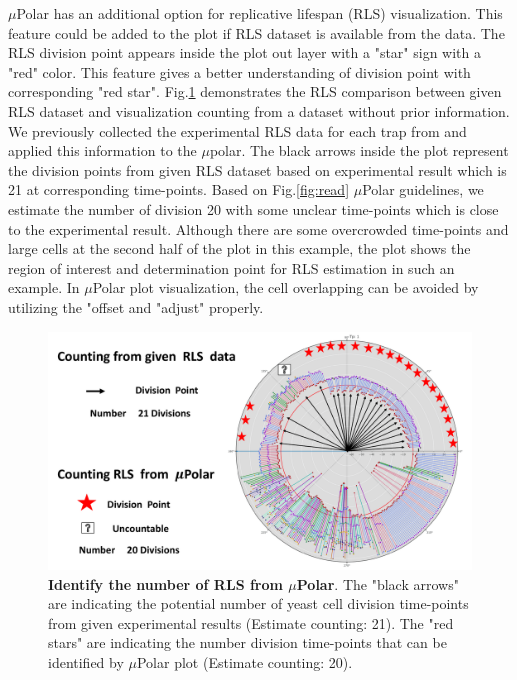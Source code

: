 \documentclass[conference]{IEEEtran}
\begin{document}
$\mu$Polar has an additional option for replicative lifespan (RLS) visualization. This feature could be added to the plot if RLS dataset is available from the data. The RLS division point appears inside the plot out layer with a "star" sign with a "red" color. This feature gives a better understanding of division point with corresponding "red star".  Fig.\ref{fig:rls} demonstrates the RLS comparison between given RLS dataset and visualization counting from a dataset without prior information. We previously collected the experimental RLS data for each trap from \cite{ref02.2} and applied this information to the $\mu$polar. The black arrows inside the plot represent the division points from given RLS dataset based on experimental result which is 21 at corresponding time-points. Based on Fig.\ref{fig:read} $\mu$Polar guidelines, we estimate the number of division 20 with some unclear time-points which is close to the experimental result. Although there are some overcrowded time-points and large cells at the second half of the plot in this example, the plot shows the region of interest and determination point for RLS estimation in such an example. In $\mu$Polar plot visualization, the cell overlapping can be avoided by utilizing the "offset and "adjust" properly.       

\begin{figure}
\centering
\includegraphics[width=\textwidth,height=10 cm]{Patterns/rlsTp1.pdf}
\caption{ \textbf{Identify the number of RLS from $\mu$Polar}. The "black arrows" are indicating the potential number of yeast cell division time-points from given experimental results (Estimate counting: 21). The "red stars" are indicating the number division time-points that can be identified by $\mu$Polar plot (Estimate counting: 20).}
\label{fig:rls}
\end{figure}
\end{document}
